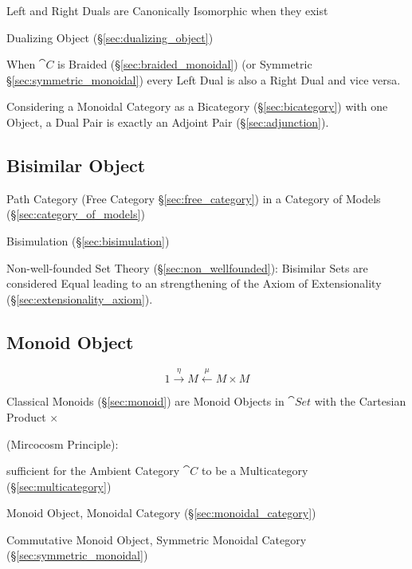 Left and Right Duals are Canonically Isomorphic when they exist

Dualizing Object (\S\ref{sec:dualizing_object})

When $\cat{C}$ is Braided (\S\ref{sec:braided_monoidal}) (or Symmetric
\S\ref{sec:symmetric_monoidal}) every Left Dual is also a Right Dual
and vice versa.

Considering a Monoidal Category as a Bicategory
(\S\ref{sec:bicategory}) with one Object, a Dual Pair is exactly an
Adjoint Pair (\S\ref{sec:adjunction}).



\subsection{Bisimilar Object}\label{sec:bisimilar_object}

Path Category (Free Category \S\ref{sec:free_category}) in a Category
of Models (\S\ref{sec:category_of_models})

Bisimulation (\S\ref{sec:bisimulation})

Non-well-founded Set Theory (\S\ref{sec:non_wellfounded}): Bisimilar
Sets are considered Equal leading to an strengthening of the Axiom of
Extensionality (\S\ref{sec:extensionality_axiom}).



\subsection{Monoid Object}\label{sec:monoid_object}

\[
  1 \xrightarrow{\eta} M \xleftarrow{\mu} M \times M
\]

Classical Monoids (\S\ref{sec:monoid}) are Monoid Objects in
$\cat{Set}$ with the Cartesian Product $\times$

(Mircocosm Principle): %

sufficient for the Ambient Category $\cat{C}$ to be a Multicategory
(\S\ref{sec:multicategory})

Monoid Object, Monoidal Category (\S\ref{sec:monoidal_category})

Commutative Monoid Object, Symmetric Monoidal Category
(\S\ref{sec:symmetric_monoidal})

